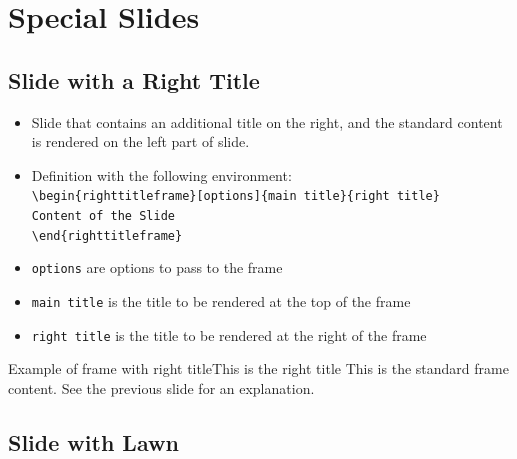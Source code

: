 \documentclass[english,sectioncirclenumberstyle]{ciadbeamer}
\begin{document}
\section{Special Slides}
\sectiontableofcontentslide

\subsection{Slide with a Right Title}

\begin{frame}{\subsecname}
	\begin{itemize}
	\item Slide that contains an additional title on the right, and the standard content is rendered on the left part of slide.
	\item Definition with the following environment: \\
		\texttt{{\textbackslash}begin\{righttitleframe\}[options]\{main title\}\{right title\}} \\
		\texttt{Content of the Slide} \\
		\texttt{{\textbackslash}end\{righttitleframe\}}
	\item \texttt{options} are options to pass to the frame
	\item \texttt{main title} is the title to be rendered at the top of the frame
	\item \texttt{right title} is the title to be rendered at the right of the frame
	\end{itemize}
\end{frame}

\begin{righttitleframe}{Example of frame with right title}{This is the right title}
	This is the standard frame content. See the previous slide for an explanation.
\end{righttitleframe}

\subsection{Slide with Lawn}
\end{document}
